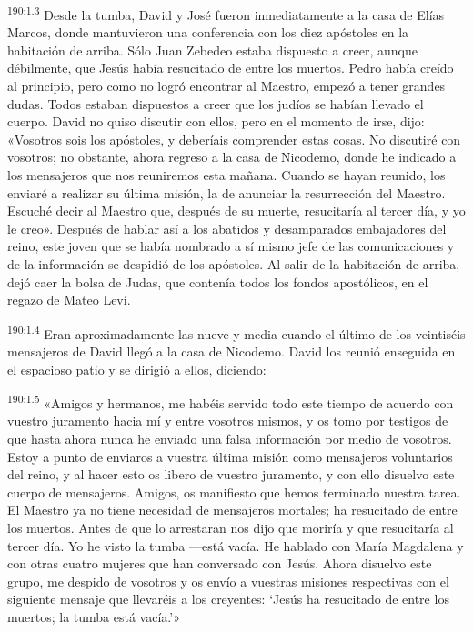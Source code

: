 \par
\textsuperscript{190:1.3} Desde la tumba, David y José fueron inmediatamente a la casa de Elías Marcos, donde mantuvieron una conferencia con los diez apóstoles en la habitación de arriba. Sólo Juan Zebedeo estaba dispuesto a creer, aunque débilmente, que Jesús había resucitado de entre los muertos. Pedro había creído al principio, pero como no logró encontrar al Maestro, empezó a tener grandes dudas. Todos estaban dispuestos a creer que los judíos se habían llevado el cuerpo. David no quiso discutir con ellos, pero en el momento de irse, dijo: «Vosotros sois los apóstoles, y deberíais comprender estas cosas. No discutiré con vosotros; no obstante, ahora regreso a la casa de Nicodemo, donde he indicado a los mensajeros que nos reuniremos esta mañana. Cuando se hayan reunido, los enviaré a realizar su última misión, la de anunciar la resurrección del Maestro. Escuché decir al Maestro que, después de su muerte, resucitaría al tercer día, y yo le creo». Después de hablar así a los abatidos y desamparados embajadores del reino, este joven que se había nombrado a sí mismo jefe de las comunicaciones y de la información se despidió de los apóstoles. Al salir de la habitación de arriba, dejó caer la bolsa de Judas, que contenía todos los fondos apostólicos, en el regazo de Mateo Leví.

\par
\textsuperscript{190:1.4} Eran aproximadamente las nueve y media cuando el último de los veintiséis mensajeros de David llegó a la casa de Nicodemo. David los reunió enseguida en el espacioso patio y se dirigió a ellos, diciendo:

\par
\textsuperscript{190:1.5} «Amigos y hermanos, me habéis servido todo este tiempo de acuerdo con vuestro juramento hacia mí y entre vosotros mismos, y os tomo por testigos de que hasta ahora nunca he enviado una falsa información por medio de vosotros. Estoy a punto de enviaros a vuestra última misión como mensajeros voluntarios del reino, y al hacer esto os libero de vuestro juramento, y con ello disuelvo este cuerpo de mensajeros. Amigos, os manifiesto que hemos terminado nuestra tarea. El Maestro ya no tiene necesidad de mensajeros mortales; ha resucitado de entre los muertos. Antes de que lo arrestaran nos dijo que moriría y que resucitaría al tercer día. Yo he visto la tumba ---está vacía. He hablado con María Magdalena y con otras cuatro mujeres que han conversado con Jesús. Ahora disuelvo este grupo, me despido de vosotros y os envío a vuestras misiones respectivas con el siguiente mensaje que llevaréis a los creyentes: `Jesús ha resucitado de entre los muertos; la tumba está vacía.'»


